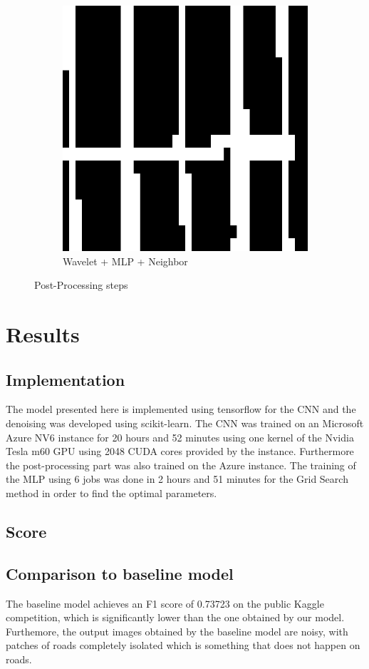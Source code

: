 \documentclass[10pt,conference,compsocconf]{IEEEtran}
\begin{document}
\begin{figure}
\begin{subfigure}{.3\columnwidth}
  \includegraphics[width=.8\linewidth]{final_res.png}
  \caption{Wavelet + MLP + Neighbor}
\end{subfigure}
\caption{Post-Processing steps}
\label{fig:denoising}
\end{figure}


\section{Results}
\label{sec:results}
\subsection{Implementation}
The model presented here is implemented using tensorflow for the CNN and the denoising was developed using scikit-learn. The CNN was trained on an Microsoft Azure NV6 instance for 20 hours and 52 minutes using one kernel of the Nvidia Tesla m60 GPU using 2048 CUDA cores provided by the instance. Furthermore the post-processing part was also trained on the Azure instance. The training of the MLP using 6 jobs was done in 2 hours and 51 minutes for the Grid Search method in order to find the optimal parameters.
\subsection{Score}


\subsection{Comparison to baseline model}
The baseline model achieves an F1 score of 0.73723 on the public Kaggle competition, which is significantly lower than the one obtained by our model. Furthemore, the output images obtained by the baseline model are noisy, with patches of roads completely isolated which is something that does not happen on roads.
\end{document}
